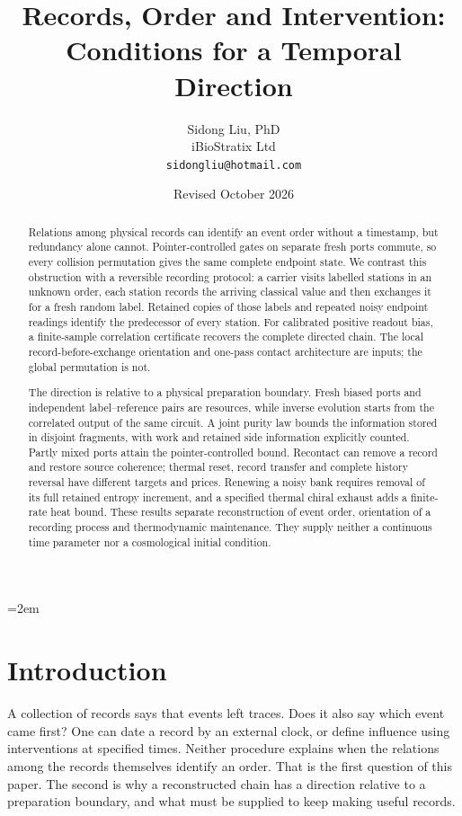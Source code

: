 \documentclass[12pt,a4paper]{article}
\title{Records, Order and Intervention:\\
Conditions for a Temporal Direction}
\author{
  Sidong Liu, PhD \\
  iBioStratix Ltd \\
  \texttt{sidongliu@hotmail.com}
}
\date{Revised October 2026}
\begin{document}
\emergencystretch=2em
\raggedbottom
{}

\maketitle

\begin{abstract}
Relations among physical records can identify an event order without a
timestamp, but redundancy alone cannot. Pointer-controlled gates on
separate fresh ports commute, so every collision permutation gives the
same complete endpoint state. We contrast this obstruction with a
reversible recording protocol: a carrier visits labelled stations in an
unknown order, each station records the arriving classical value and then
exchanges it for a fresh random label. Retained copies of those labels
and repeated noisy endpoint readings identify the predecessor of every station.
For calibrated positive readout bias, a finite-sample correlation
certificate recovers the complete directed chain. The local
record-before-exchange orientation and one-pass contact architecture are
inputs; the global permutation is not.

The direction is relative to a physical preparation boundary.
Fresh biased ports and independent label--reference pairs are resources,
while inverse evolution starts from the correlated output of the same
circuit. A joint purity law bounds the information stored in disjoint
fragments, with work and retained side information explicitly counted.
Partly mixed ports attain the pointer-controlled bound. Recontact can
remove a record and restore source coherence; thermal reset, record
transfer and complete history reversal have different targets and prices.
Renewing a noisy bank requires removal of its full retained entropy
increment, and a specified thermal chiral exhaust adds a finite-rate
heat bound. These results separate reconstruction of event order,
orientation of a recording process and thermodynamic maintenance.
They supply neither a continuous time parameter nor a cosmological
initial condition.
\end{abstract}

\section{Introduction}
\label{sec:intro}

A collection of records says that events left traces. Does it also say
which event came first? One can date a record by an external clock, or
define influence using interventions at specified times. Neither
procedure explains when the relations among the records themselves
identify an order. That is the first question of this paper. The second
is why a reconstructed chain has a direction relative to a preparation
boundary, and what must be supplied to keep making useful records.
\end{document}
